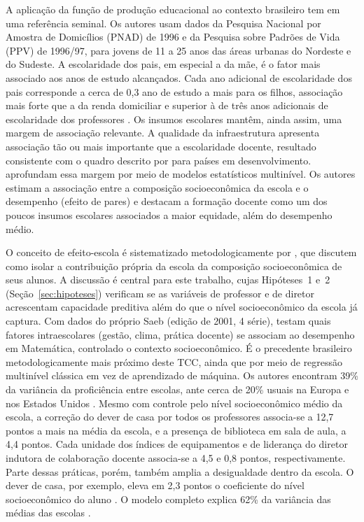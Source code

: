 A aplicação da função de produção educacional ao contexto brasileiro tem em
 uma referência seminal. Os autores
usam dados da Pesquisa Nacional por Amostra de Domicílios (PNAD) de 1996 e
da Pesquisa sobre Padrões de Vida (PPV) de 1996/97, para jovens de 11 a 25
anos das áreas urbanas do Nordeste e do Sudeste. A escolaridade dos pais,
em especial a da mãe, é o fator mais associado aos anos de estudo
alcançados. Cada ano adicional de escolaridade dos pais corresponde a
cerca de 0,3 ano de estudo a mais para os filhos, associação mais forte que
a da renda domiciliar e superior à de três anos adicionais de escolaridade
dos professores \cite[p.~34]{barros2001determinantes}. Os insumos escolares
mantêm, ainda assim, uma margem de associação relevante. A qualidade da
infraestrutura apresenta associação tão ou mais importante que a
escolaridade docente, resultado consistente com o quadro descrito por
 para países em desenvolvimento.
 aprofundam essa margem por meio de
modelos estatísticos multinível. Os autores estimam a associação entre a
composição socioeconômica da escola e o desempenho (efeito de pares) e
destacam a formação docente como um dos poucos insumos escolares
associados a maior equidade, além do desempenho médio.

O conceito de efeito-escola é sistematizado metodologicamente por
, que discutem como isolar a contribuição
própria da escola da composição socioeconômica de seus alunos. A discussão
é central para este trabalho, cujas Hipóteses~1 e~2
(Seção~\ref{sec:hipoteses}) verificam se as variáveis de professor e de
diretor acrescentam capacidade preditiva além do que o nível
socioeconômico da escola já captura. Com dados do próprio Saeb (edição de
2001, 4\textordfeminine{} série),  testam
quais fatores intraescolares (gestão, clima, prática docente) se associam
ao desempenho em Matemática, controlado o contexto socioeconômico. É o
precedente brasileiro metodologicamente mais próximo deste TCC, ainda que
por meio de regressão multinível clássica em vez de aprendizado de
máquina. Os autores encontram 39\% da variância da proficiência entre
escolas, ante cerca de 20\% usuais na Europa e nos Estados Unidos
\cite[p.~288]{franco2007qualidade}. Mesmo com controle pelo nível
socioeconômico médio da escola, a correção do dever de casa por todos os
professores associa-se a 12,7 pontos a mais na média da escola, e a
presença de biblioteca em sala de aula, a 4,4 pontos. Cada unidade dos
índices de equipamentos e de liderança do diretor indutora de colaboração
docente associa-se a 4,5 e 0,8 pontos, respectivamente. Parte dessas
práticas, porém, também amplia a desigualdade dentro da escola. O dever de
casa, por exemplo, eleva em 2,3 pontos o coeficiente do nível
socioeconômico do aluno \cite[p.~291]{franco2007qualidade}. O modelo
completo explica 62\% da variância das médias das escolas
\cite[p.~293]{franco2007qualidade}.

